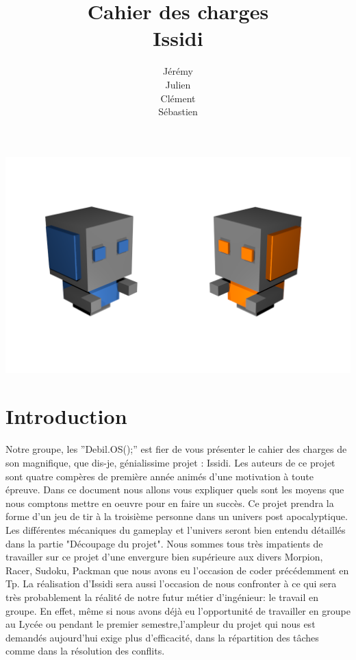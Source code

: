 ﻿\documentclass{article}
\title{Cahier des charges\\
		Issidi}
\author{Jérémy \bsc{Beuvry}\\
		Julien \bsc{Boulicaut}\\
		Clément \bsc{Finck}\\
		Sébastien \bsc{Fleury}}
\begin{document}
\maketitle
\centerline{\includegraphics[scale=0.5]{rf.png}}
\newpage
\tableofcontents
\newpage

\section{Introduction}
Notre groupe, les ''Debil.OS();'' est fier de vous présenter le cahier des charges de son magnifique, que dis-je, génialissime projet : Issidi.
\newline\newline Les auteurs de ce projet sont quatre compères de première année animés d'une motivation à toute épreuve.
\newline\newline Dans ce document nous allons vous expliquer quels sont les moyens que nous comptons mettre en oeuvre pour en faire un succès.
\newline\newline Ce projet prendra la forme d'un jeu de tir à la troisième personne dans un univers post apocalyptique.  Les différentes mécaniques du gameplay et l'univers seront bien entendu détaillés dans la partie "Découpage du projet".
\newline\newline Nous sommes tous très impatients de travailler sur ce projet d'une envergure bien supérieure aux divers Morpion, Racer, Sudoku, Packman que nous avons eu l'occasion de coder précédemment en Tp.
\newline\newline La réalisation d'Issidi sera aussi l'occasion de nous confronter à ce qui sera très probablement la réalité de notre futur métier d'ingénieur: le travail en groupe.
En effet, même si nous avons déjà eu l'opportunité de travailler en groupe au Lycée ou pendant le premier semestre,l'ampleur du projet qui nous est demandés aujourd'hui exige plus d'efficacité, dans la répartition des tâches comme dans la résolution des conflits.
\end{document}
